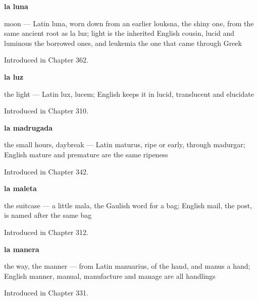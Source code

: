 \noindent\begin{minipage}[t]{\linewidth}
\raggedright
\textbf{la luna}\par
\small moon — Latin luna, worn down from an earlier louksna, the shiny one, from the same ancient root as la luz; light is the inherited English cousin, lucid and luminous the borrowed ones, and leukemia the one that came through Greek\par
\footnotesize Introduced in Chapter 362.
\end{minipage}\par\medskip

\noindent\begin{minipage}[t]{\linewidth}
\raggedright
\textbf{la luz}\par
\small the light — Latin lux, lucem; English keeps it in lucid, translucent and elucidate\par
\footnotesize Introduced in Chapter 310.
\end{minipage}\par\medskip

\noindent\begin{minipage}[t]{\linewidth}
\raggedright
\textbf{la madrugada}\par
\small the small hours, daybreak — Latin maturus, ripe or early, through madurgar; English mature and premature are the same ripeness\par
\footnotesize Introduced in Chapter 342.
\end{minipage}\par\medskip

\noindent\begin{minipage}[t]{\linewidth}
\raggedright
\textbf{la maleta}\par
\small the suitcase — a little mala, the Gaulish word for a bag; English mail, the post, is named after the same bag\par
\footnotesize Introduced in Chapter 312.
\end{minipage}\par\medskip

\noindent\begin{minipage}[t]{\linewidth}
\raggedright
\textbf{la manera}\par
\small the way, the manner — from Latin manuarius, of the hand, and manus a hand; English manner, manual, manufacture and manage are all handlings\par
\footnotesize Introduced in Chapter 331.
\end{minipage}\par\medskip


